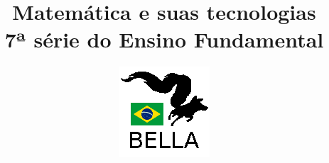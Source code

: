 \documentclass{book}
\begin{document}
\title{Matemática e suas tecnologias \\
7ª série do Ensino Fundamental}
\author{\includegraphics{../../logos/128x128-brazil.png}}

\maketitle

\tableofcontents







\end{document}
